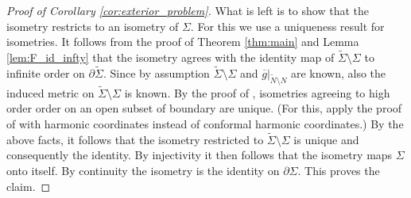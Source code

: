 \documentclass[12pt]{amsart}
\def\p{\partial}
\def\R{\mathbb R}
\DeclarePairedDelimiter\norm{\lVert}{\rVert}
\theoremstyle{definition}
\theoremstyle{remark}
\newcommand{\eps}{\epsilon}
\begin{document}
\begin{proof}[Proof of Corollary \ref{cor:exterior_problem}]
 
 What is left is to show that the isometry restricts to an isometry of $\Sigma$. For this we use a uniqueness result for isometries. It follows from the proof of Theorem \ref{thm:main} and Lemma \ref{lem:F_id_infty} that the isometry agrees with the identity map of $\widetilde \Sigma \setminus \Sigma$ to infinite order on $\p\widetilde\Sigma$. Since by assumption $\widetilde \Sigma\setminus \Sigma$ and $\overline g|_{\widetilde N\setminus N}$ are known, also the induced metric on $\widetilde \Sigma\setminus \Sigma$ is known. By the proof of \cite[Theorem 3.3]{lassas2019conformal}, isometries agreeing to high order order on an open subset of boundary are unique. (For this, apply the proof of \cite[Theorem 3.3]{lassas2019conformal} with harmonic coordinates instead of conformal harmonic coordinates.) By the above facts, it follows that the isometry restricted to $\widetilde \Sigma \setminus \Sigma$ is unique and consequently the identity.  
 By injectivity it then follows that the isometry maps $\Sigma$ onto itself. By continuity the isometry is the identity on $\p \Sigma$. This proves the claim.  
% 
% 
% 

\end{proof}
\end{document}

